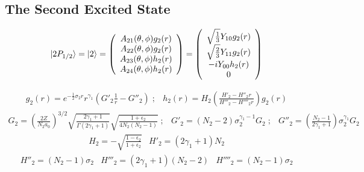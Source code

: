     \subsection{The Second Excited State}
    \begin{equation}
	|2P_{1/2} \rangle = |2 \rangle = 
		\left(
			\begin{array}{c}
				A_{21}(\theta,\phi) g_2(r) \\
				A_{22}(\theta,\phi) g_2(r) \\
				A_{23}(\theta,\phi) h_2(r) \\
				A_{24}(\theta,\phi) h_2(r)
			\end{array}
		\right)
		=
		\left(
			\begin{array}{c}
				\sqrt{\frac{1}{3}} Y_{10} g_2(r) \\
			    \sqrt{\frac{2}{3}} Y_{11} g_2(r) \\
			    -i Y_{00} h_2(r) \\
				0
			\end{array}
		\right)
\end{equation}

\begin{equation}
\begin{array}{cc}
		g_2(r) = e^{-\frac{1}{2}\sigma_2 r} r^{\gamma_1}
				    \left(
						G'_2 \frac{1}{r} - G''_2
					\right) 
    \; ; &
       	h_2(r) = H_2 
			 \left(
			 	\frac{H'_2 - H''_2 r}{H'''_2 - H''''_2 r}
			 \right) g_2(r)
\end{array}
\end{equation}
\[
    \begin{array}{ccc}
	G_2 	 =  \left( \frac{2Z}{N_2 a_0} \right)^{3/2}
				  \sqrt{\frac{2\gamma_1 + 1}{\Gamma(2\gamma_1 + 1)}} 
				  \sqrt{\frac{1+\epsilon_2}{4N_2 (N_2 - 1)}} 
    \; ; &
	G'_2	 =  (N_2 - 2) \sigma_2^{\gamma_1 - 1} G_2 
    \; ; &
	G''_2 	 =  \left( \frac{N_2 - 1}{2\gamma_1 + 1} \right) \sigma_2^{\gamma_1} G_2
    \end{array}
\]
\[
\begin{array}{cc}
	H_2		 =  -\sqrt{\frac{1-\epsilon_2}{1+\epsilon_2}} 
    &
	H'_2	 =  (2\gamma_1 + 1)N_2 
\end{array}
\]
\[
\begin{array}{ccc}
	H''_2 	 =  (N_2 - 1)\sigma_2 
    &
	H'''_2 	 =  (2\gamma_1 + 1)(N_2 - 2) 
    &
	H''''_2  =  (N_2 - 1)\sigma_2
\end{array}
\]

